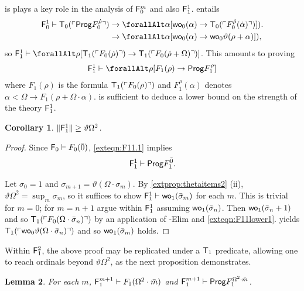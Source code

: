 \documentclass[UKenglish,cleveref,DIV=12]{scrartcl}
\let\forall\forallAlt
\newtheorem{lemma}{Lemma}
\newtheorem{corollary}[lemma]{Corollary}
\theoremstyle{definition}
\theoremstyle{definition}
\begin{document}
 is plays a key role in the analysis of $\mathsf{F}_0^m$ and also $\mathsf{F}_1^1$.  entails
\begin{align*}
 \F_0^1\proves\T_0(\gn{\Prog  F_0^{\dot\rho}})
	&\rightarrow {\forall\alpha[\wo_0(\alpha)\rightarrow \T_0(\gn{F_0^{\dot\rho}(\dot\alpha)})]}).\\
	&\rightarrow {\forall\alpha[\wo_0(\alpha)\rightarrow \wo_0\vartheta(\rho+\alpha)]}),
\end{align*}
so $\F_1^1\proves \forall\rho[\T_1(\gn{F_0(\dot\rho)})\rightarrow \T_1(\gn{F_0(\dot\rho+\Omega)})]$. This amounts to proving
\begin{align}\label{exteqn:F11.1}
  \F_1^1\proves \forall\rho[{F_1(\rho)}\rightarrow \Prog  F_1^\rho]
\end{align}
where $F_1(\rho)$ is the formula $\mathsf{T}_1(\ulcorner{F_0(\rho)}\urcorner)$ and
$F_1^\rho(\alpha)$ denotes $\alpha<\Omega\rightarrow F_1(\rho+\Omega\cdot\alpha)$.
 is sufficient to deduce a lower bound on the strength of the
theory $\mathsf{F}_1^1$.
\begin{corollary}\label{extcor:F11lowerbound}
  $\lVert{\mathsf{F}_1^1}\rVert\ge\vartheta\Omega^2$.
\end{corollary}
\begin{proof}
Since $\mathsf{F}_0\vdash F_0(\bar0)$, \cref{exteqn:F11.1} implies
\begin{gather}\label{exteqn:F11lower1}
 \mathsf{F}_1^1\vdash \mathsf{Prog}  F^{\bar 0}_1.
\end{gather}

Let $\sigma_0=1$ and $\sigma_{m+1}=\vartheta(\Omega\cdot\sigma_m)$. By
\cref{extprop:thetaitems2} (ii), $\vartheta\Omega^2=\sup_m\sigma_m$, so it
suffices to show $\mathsf{F}_1^1\vdash\mathsf{wo}_1(\bar\sigma_m)$ for each $m$. This is
trivial for $m=0$; for $m=n+1$ argue within $\mathsf{F}_1^1$ assuming
$\mathsf{wo}_1(\bar\sigma_n)$. Then $\mathsf{wo}_1(\bar\sigma_n+1)$ and so $\mathsf{T}_1(\ulcorner{F_0(\Omega\cdot\bar\sigma_n)}\urcorner)$
by an application of -Elim and \cref{exteqn:F11lower1}.  yields $\mathsf{T}_1(\ulcorner{\mathsf{wo}_0\vartheta(\Omega\cdot\bar\sigma_n)}\urcorner)$ and so $\mathsf{wo}_1(\bar\sigma_m)$
holds.
\end{proof}
Within $\mathsf{F}_1^2$, the above proof may be replicated under a $\mathsf{T}_1$ predicate,
allowing one to reach ordinals beyond $\vartheta\Omega^2$, as the next
proposition demonstrates.
\begin{lemma}\label{extprop:F1wellordering}
For each $m$, $\mathsf{F}_1^{m+1}\vdash F_1(\Omega^2\cdot\bar m)$ and $\mathsf{F}_1^{m+1}\vdash \mathsf{Prog}  F_1^{\Omega^2\cdot\bar m}$.
\end{lemma}
\end{document}
